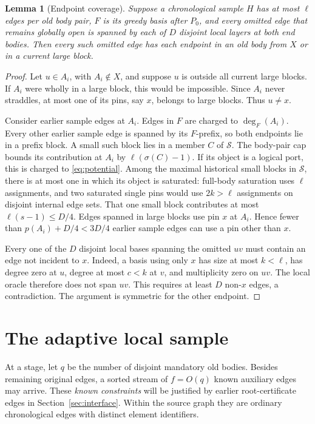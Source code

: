\documentclass[11pt,a4paper]{article}
\newtheorem{lemma}[theorem]{Lemma}
\theoremstyle{definition}
\theoremstyle{remark}
\begin{document}
\begin{lemma}[Endpoint coverage]\label{lem:cover}
Suppose a chronological sample $H$ has at most $\ell$
edges per old body pair, $F$ is its greedy basis after
$P_0$, and every omitted edge that remains globally open
is spanned by each of $D$ disjoint local layers at both
end bodies. Then every such omitted edge has each endpoint
in an old body from $X$ or in a current large block.
\end{lemma}
\begin{proof}
Let $u\in A_i$, with $A_i\notin X$, and suppose $u$ is
outside all current large blocks. If $A_i$ were wholly
in a large block, this would be impossible.
Since $A_i$ never straddles, at most one of its pins,
say $x$, belongs to large blocks. Thus $u\ne x$.

Consider earlier sample edges at $A_i$.
Edges in $F$ are charged to $\deg_F(A_i)$.
Every other earlier sample edge is spanned by its
$F$-prefix, so both endpoints lie in a prefix block.
A small such block lies in a member $C$ of $\mathcal S$.
The body-pair cap bounds its contribution at $A_i$ by
$\ell(\sigma(C)-1)$.
If its object is a logical port, this is charged to
\eqref{eq:potential}. Among the maximal historical small blocks
in $\mathcal S$, there is at most one in which its object is
saturated: full-body saturation
uses $\ell$ assignments, and two saturated single pins
would use $2k>\ell$ assignments on disjoint internal
edge sets. That one small block contributes at most
$\ell(s-1)\leq D/4$.
Edges spanned in large blocks use pin $x$ at $A_i$.
Hence fewer than $p(A_i)+D/4<3D/4$ earlier sample
edges can use a pin other than $x$.

Every one of the $D$ disjoint local bases spanning the
omitted $uv$ must contain an edge not incident to $x$.
Indeed, a basis using only $x$ has size at most
$k<\ell$, has degree zero at $u$, degree at most
$c<k$ at $v$, and multiplicity zero on $uv$.
The local oracle therefore does not span $uv$.
This requires at least $D$ non-$x$ edges, a contradiction.
The argument is symmetric for the other endpoint.
\end{proof}

\section{The adaptive local sample}
\label{sec:sample}

At a stage, let $q$ be the number of disjoint mandatory
old bodies. Besides remaining original edges, a sorted
stream of $f=O(q)$ known auxiliary edges may arrive.
These \emph{known constraints} will be justified by earlier
root-certificate edges in Section~\ref{sec:interface}.
Within the source graph they are ordinary chronological
edges with distinct element identifiers.
\end{document}
